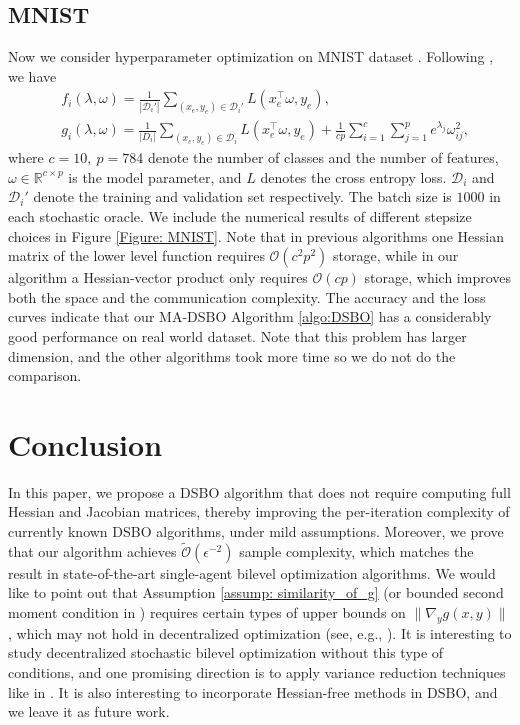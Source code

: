 \documentclass{article}
\theoremstyle{plain}
\theoremstyle{definition}
\theoremstyle{remark}
\newcommand{\R}{\mathbb{R}}
\newcommand{\cD}{\mathcal{D}}
\newcommand{\cO}{\mathcal{O}}
\begin{document}
\subsection{MNIST}
Now we consider hyperparameter optimization on MNIST dataset \citep{lecun1998gradient}. Following \citet{grazzi2020iteration}, we have
\[
    \begin{aligned}
        &f_i(\lambda, \omega)= \frac{1}{|\cD_i'|}\sum_{(x_e,y_e)\in\cD_i' }L(x_e^{\top}\omega, y_e), \\
        &g_i(\lambda, \omega)= \frac{1}{|D_i|}\sum_{(x_e,y_e)\in \cD_i}L(x_e^{\top}\omega, y_e) + \frac{1}{cp}\sum_{i=1}^{c}\sum_{j=1}^{p}e^{\lambda_j}\omega_{ij}^2,
    \end{aligned}
\]
where $c=10,\ p = 784$ denote the number of classes and the number of features, $\omega \in\R^{c\times p}$ is the model parameter, and $L$ denotes the cross entropy loss. $\cD_i$ and $\cD_i'$ denote the training and validation set respectively. The batch size is $1000$ in each stochastic oracle. We include the numerical results of different stepsize choices in Figure \ref{Figure: MNIST}. Note that in previous algorithms \citep{chen2022decentralized, yang2022decentralized} one Hessian matrix of the lower level function requires $\cO(c^2p^2)$ storage, while in our algorithm a Hessian-vector product only requires $\cO(cp)$ storage, which improves both the space and the communication complexity. The accuracy and the loss curves indicate that our MA-DSBO Algorithm \ref{algo:DSBO} has a considerably good performance on real world dataset. Note that this problem has larger dimension, and the other algorithms took more time so we do not do the comparison.
\section{Conclusion}
In this paper, we propose a DSBO algorithm that does not require computing full Hessian and Jacobian matrices, thereby improving the per-iteration complexity of currently known DSBO algorithms, under mild assumptions. Moreover, we prove that our algorithm achieves $\tilde{\cO}(\epsilon^{-2})$ sample complexity, which matches the result in state-of-the-art single-agent bilevel optimization algorithms. We would like to point out that Assumption \ref{assump: similarity_of_g} (or bounded second moment condition in \citet{yang2022decentralized}) requires certain types of upper bounds on $\|\nabla_yg(x,y)\|$, which may not hold in decentralized optimization (see, e.g., \citet{pu2021distributed}). It is interesting to study decentralized stochastic bilevel optimization without this type of conditions, and one promising direction is to apply variance reduction techniques like in \citet{tang2018d}. It is also interesting to incorporate Hessian-free methods \citep{sowconvergence} in DSBO, and we leave it as future work.
\end{document}
